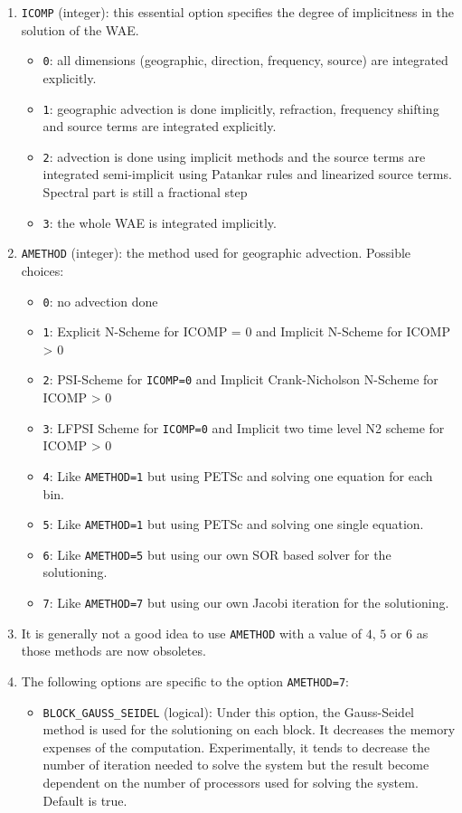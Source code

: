 \documentclass[12pt]{amsart}
\begin{document}
\begin{enumerate}
\item {\tt ICOMP} (integer): this essential option specifies the degree of implicitness in the solution of the WAE.
  \begin{itemize}
  \item {\tt 0}: all dimensions (geographic, direction, frequency, source) are integrated explicitly.
  \item {\tt 1}: geographic advection is done implicitly, refraction, frequency shifting and source terms are integrated explicitly.
  \item {\tt 2}: advection is done using implicit methods and the source terms are integrated semi-implicit using Patankar rules and linearized source terms. Spectral part is still a fractional step
  \item {\tt 3}: the whole WAE is integrated implicitly.
  \end{itemize}
\item {\tt AMETHOD} (integer): the method used for geographic advection. Possible choices:
  \begin{itemize}
  \item {\tt 0}: no advection done
  \item {\tt 1}: Explicit N-Scheme for ICOMP = 0 and Implicit N-Scheme for ICOMP > 0
  \item {\tt 2}: PSI-Scheme for {\tt ICOMP=0} and Implicit Crank-Nicholson N-Scheme for ICOMP > 0
  \item {\tt 3}: LFPSI Scheme for {\tt ICOMP=0} and Implicit two time level N2 scheme for ICOMP > 0
  \item {\tt 4}: Like {\tt AMETHOD=1} but using PETSc and solving one equation for each bin.
  \item {\tt 5}: Like {\tt AMETHOD=1} but using PETSc and solving one single equation.
  \item {\tt 6}: Like {\tt AMETHOD=5} but using our own SOR based solver for the solutioning.
  \item {\tt 7}: Like {\tt AMETHOD=7} but using our own Jacobi iteration for the solutioning.
  \end{itemize}
\item It is generally not a good idea to use {\tt AMETHOD} with a value of $4$, $5$ or $6$ as those methods are now obsoletes.
\item The following options are specific to the option {\tt AMETHOD=7}:
  \begin{itemize}
  \item {\tt BLOCK\_GAUSS\_SEIDEL} (logical): Under this option, the Gauss-Seidel method is used for the solutioning on each block. It decreases the memory expenses of the computation. Experimentally, it tends to decrease the number of iteration needed to solve the system but the result become dependent on the number of processors used for solving the system. Default is true.

\end{itemize}
\end{enumerate}
\end{document}
